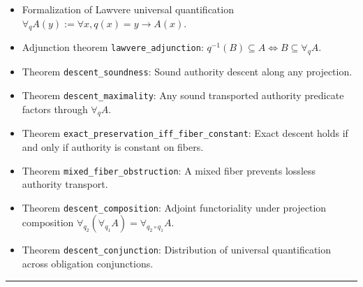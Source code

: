 \documentclass[
  10pt,
]{article}
\providecommand{\tightlist}{%
  \setlength{\itemsep}{0pt}\setlength{\parskip}{0pt}}
\providecommand{\tightlist}{%
  \setlength{\itemsep}{0pt}\setlength{\parskip}{0pt}}
\begin{document}
\begin{enumerate}
  \begin{itemize}
  \tightlist
  \item
    Formalization of Lawvere universal quantification \hypertarget{math-E0148-0209}{}{\(\forall_q A(y) := \forall x, q(x) = y \to A(x)\)}.
  \item
    Adjunction theorem \texttt{lawvere\_adjunction}: \hypertarget{math-E0149-0210}{}{\(q^{-1}(B) \subseteq A \iff B \subseteq \forall_q A\)}.
  \item
    Theorem \texttt{descent\_soundness}: Sound authority descent along any projection.
  \item
    Theorem \texttt{descent\_maximality}: Any sound transported authority predicate factors through \hypertarget{math-E0064-0211}{}{\(\forall_q A\)}.
  \item
    Theorem \texttt{exact\_preservation\_iff\_fiber\_constant}: Exact descent holds if and only if authority is constant on fibers.
  \item
    Theorem \texttt{mixed\_fiber\_obstruction}: A mixed fiber prevents lossless authority transport.
  \item
    Theorem \texttt{descent\_composition}: Adjoint functoriality under projection composition \hypertarget{math-E0150-0212}{}{\(\forall_{q_2} (\forall_{q_1} A) = \forall_{q_2 \circ q_1} A\)}.
  \item
    Theorem \texttt{descent\_conjunction}: Distribution of universal quantification across obligation conjunctions.
  \end{itemize}
\end{enumerate}

\begin{center}\rule{0.5\linewidth}{0.5pt}\end{center}
\end{document}
